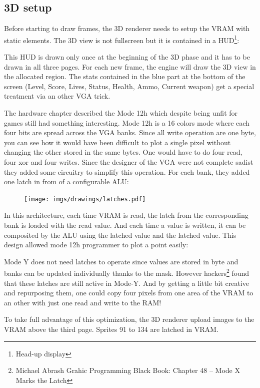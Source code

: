 \subsection{3D setup}
Before starting to draw frames, the 3D renderer needs to setup the VRAM with static elements. The 3D view is not fullscreen but it is contained in a HUD\footnote{Head-up display}:
\begin{figure}[H]
  \centering
\end{figure}
This HUD is drawn only once at the beginning of the 3D phase and it has to be drawn in all three pages. For each new frame, the engine will draw the 3D view in the allocated region. The stats contained in the blue part at the bottom of the screen (Level, Score, Lives, Status, Health, Ammo, Current weapon) get a special treatment via an other VGA trick.\\
\par

The hardware chapter described the Mode 12h which despite being unfit for games still had something interesting. Mode 12h is a 16 colors mode where each four bits are spread across the VGA banks. Since all write operation are one byte, you can see how it would have been difficult to plot a single pixel without changing the other stored in the same bytes. One would have to do four read, four xor and four writes. Since the designer of the VGA were not complete sadist they added some circuitry to simplify this operation. For each bank, they added one latch in from of a configurable ALU:\\
\par
 \begin{figure}[H]
\centering
 \texttt{[image: imgs/drawings/latches.pdf]}
 \end{figure}
In this architecture, each time VRAM is read, the latch from the corresponding bank is loaded with the read value. And each time a value is written, it can be composited by the ALU using the latched value and the latched value. This design allowed mode 12h programmer to plot a point easily:\\
\par
{}
\par
Mode Y does not need latches to operate since values are stored in byte and banks can be updated individually thanks to the mask. However hackers\footnote{Michael Abrash Grahic Programming Black Book: Chapter 48 -- Mode X Marks the Latch} found that these latches are still active in  Mode-Y. And by getting a little bit creative and repurposing them, one could copy four pixels from one area of the VRAM to an other with just one read and write to the RAM!\\
\par
To take full advantage of this optimization, the 3D renderer upload images to the VRAM above the third page. Sprites 91 to 134 are latched in VRAM.\\

